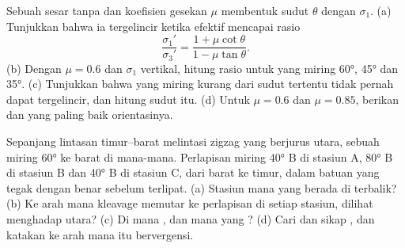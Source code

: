 \begin{exercise}[$\star\star\star$]\label{exo:b1:faults-folds-fabrics:10}
Sebuah sesar tanpa  dan koefisien gesekan $\mu$ membentuk sudut $\theta$ dengan $\sigma_1$. (a) Tunjukkan bahwa ia tergelincir ketika  efektif mencapai rasio
\[
  \frac{\sigma_1'}{\sigma_3'} = \frac{1 + \mu\cot\theta}{1 - \mu\tan\theta} .
\]
(b) Dengan $\mu = 0.6$ dan $\sigma_1$ vertikal, hitung rasio untuk  yang miring \ang{60}, \ang{45} dan \ang{35}. (c) Tunjukkan bahwa  yang miring kurang dari sudut tertentu tidak pernah dapat tergelincir, dan hitung sudut itu. (d) Untuk $\mu = 0.6$ dan $\mu = 0.85$, berikan   dan  yang paling baik orientasinya.
\end{exercise}

\begin{exercise}[$\star\star\star$]\label{exo:b1:faults-folds-fabrics:11}
Sepanjang lintasan timur--barat melintasi  zigzag yang  berjurus utara, sebuah  miring \ang{60} ke barat di mana-mana. Perlapisan miring \ang{40} B di stasiun A, \ang{80} B di stasiun B dan \ang{40} B di stasiun C, dari barat ke timur, dalam batuan yang tegak dengan benar sebelum terlipat. (a) Stasiun mana yang berada di  terbalik? (b) Ke arah mana kleavage memutar ke perlapisan di setiap stasiun, dilihat menghadap utara? (c) Di mana , dan mana yang ? (d) Cari  dan sikap , dan katakan ke arah mana  itu bervergensi.
\end{exercise}

